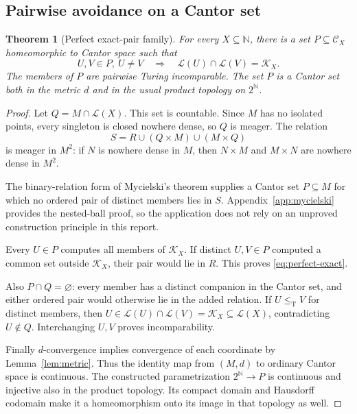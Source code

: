 \documentclass[11pt,a4paper]{article}
\newcommand{\N}{\mathbb N}
\newcommand{\Cantor}{2^{\N}}
\newcommand{\leT}{\leq_{\mathrm T}}
\newcommand{\CD}[1]{\mathcal C_{#1}}
\newcommand{\Core}[1]{\mathcal K_{#1}}
\newcommand{\Low}[1]{\mathcal L(#1)}
\newtheorem{theorem}{Theorem}[section]
\theoremstyle{definition}\newtheorem{definition}[theorem]{Definition}
\theoremstyle{remark}\newtheorem{remark}[theorem]{Remark}
\begin{document}
\subsection{Pairwise avoidance on a Cantor set}
\begin{theorem}[Perfect exact-pair family]\label{thm:perfect}
For every $X\subseteq\N$, there is a set $P\subseteq\CD X$ homeomorphic to Cantor space such that
\begin{equation}\label{eq:perfect-exact}
 U,V\in P,\ U\ne V\quad\Longrightarrow\quad
 \Low U\cap\Low V=\Core X.
\end{equation}
The members of $P$ are pairwise Turing incomparable. The set $P$ is a Cantor set both in the metric $d$ and in the usual product topology on $\Cantor$.
\end{theorem}
\begin{proof}
Let $Q=M\cap\Low X$. This set is countable. Since $M$ has no isolated points, every singleton is closed nowhere dense, so $Q$ is meager. The relation
\[
 S=R\cup(Q\times M)\cup(M\times Q)
\]
is meager in $M^2$: if $N$ is nowhere dense in $M$, then $N\times M$ and $M\times N$ are nowhere dense in $M^2$.

The binary-relation form of Mycielski's theorem supplies a Cantor set $P\subseteq M$ for which no ordered pair of distinct members lies in $S$.\cite{Mycielski} Appendix~\ref{app:mycielski} provides the nested-ball proof, so the application does not rely on an unproved construction principle in this report.

Every $U\in P$ computes all members of $\Core X$. If distinct $U,V\in P$ computed a common set outside $\Core X$, their pair would lie in $R$. This proves \eqref{eq:perfect-exact}.

Also $P\cap Q=\varnothing$: every member has a distinct companion in the Cantor set, and either ordered pair would otherwise lie in the added relation. If $U\leT V$ for distinct members, then $U\in\Low U\cap\Low V=\Core X\subseteq\Low X$, contradicting $U\notin Q$. Interchanging $U,V$ proves incomparability.

Finally $d$-convergence implies convergence of each coordinate by Lemma~\ref{lem:metric}. Thus the identity map from $(M,d)$ to ordinary Cantor space is continuous. The constructed parametrization $2^{\N}\to P$ is continuous and injective also in the product topology. Its compact domain and Hausdorff codomain make it a homeomorphism onto its image in that topology as well.
\end{proof}
\end{document}
